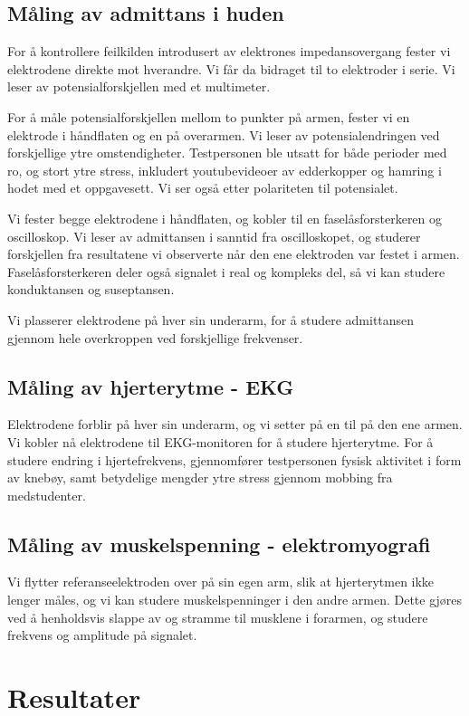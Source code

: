 \documentclass[11pt,norsk]{article}
\begin{document}
\subsection{Måling av admittans i huden}
For å kontrollere feilkilden introdusert av elektrones impedansovergang fester vi elektrodene direkte mot hverandre. Vi får da bidraget til to elektroder i serie. Vi leser av potensialforskjellen med et multimeter.

For å måle potensialforskjellen mellom to punkter på armen, fester vi en elektrode i håndflaten og en på overarmen. Vi leser av potensialendringen ved forskjellige ytre omstendigheter. Testpersonen ble utsatt for både perioder med ro, og stort ytre stress, inkludert youtubevideoer av edderkopper og hamring i hodet med et oppgavesett. Vi ser også etter polariteten til potensialet.

Vi fester begge elektrodene i håndflaten, og kobler til en faselåsforsterkeren og oscilloskop. Vi leser av admittansen i sanntid fra oscilloskopet, og studerer forskjellen fra resultatene vi observerte når den ene elektroden var festet i armen. Faselåsforsterkeren deler også signalet i real og kompleks del, så vi kan studere konduktansen og suseptansen.

Vi plasserer elektrodene på hver sin underarm, for å studere admittansen gjennom hele 
overkroppen ved forskjellige frekvenser.

\subsection{Måling av hjerterytme - EKG}
Elektrodene forblir på hver sin underarm, og vi setter på en til på den ene armen. Vi kobler nå elektrodene til EKG-monitoren for å studere hjerterytme. For å studere endring i hjertefrekvens, gjennomfører testpersonen fysisk aktivitet i form av knebøy, samt betydelige mengder ytre stress gjennom mobbing fra medstudenter.

\subsection{Måling av muskelspenning - elektromyografi}
Vi flytter referanseelektroden over på sin egen arm, slik at hjerterytmen ikke lenger måles, og vi kan studere muskelspenninger i den andre armen. Dette gjøres ved å henholdsvis slappe av og stramme til musklene i forarmen, og studere frekvens og amplitude på signalet.

\section{Resultater}
\end{document}

